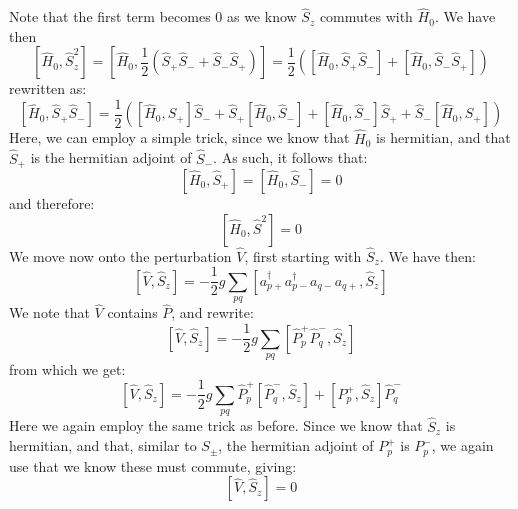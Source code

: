 \documentclass{article}
\begin{document}
Note that the first term becomes 0 as we know $\hat S_z$ commutes with $\hat H_0$. We have then
\begin{equation*}
    \left[ \hat H_0, \hat S_z^2 \right] = \left[\hat H_0, \frac{1}{2} \left(\hat S_+ \hat S_- + \hat S_- \hat S_+\right) \right] = \frac{1}{2} \left( \left[\hat H_0, \hat S_+ \hat S_-\right] + \left[\hat H_0, \hat S_- \hat S_+ \right]\right)
\end{equation*}
rewritten as:
\begin{equation*}
    \left[ \hat H_0, \hat S_+ \hat S_- \right] = \frac{1}{2} \left( \left[\hat H_0, \hat S_+\right] \hat S_- + \hat S_+ \left[\hat H_0, \hat S_- \right] +  \left[\hat H_0, \hat S_-\right] \hat S_+ + \hat S_- \left[\hat H_0, S_+ \right]\right)
\end{equation*}
Here, we can employ a simple trick, since we know that $\hat H_0$ is hermitian, and that $\hat S_+$ is the hermitian adjoint of $\hat S_-$. As such, it follows that:
\begin{equation*}
    \left[\hat H_0, \hat S_+ \right] = \left[\hat H_0, \hat S_- \right] = 0
\end{equation*}
and therefore:
\begin{equation}
    \left[\hat H_0, \hat S^2 \right] = 0
\end{equation}
We move now onto the perturbation $\hat V$, first starting with $\hat S_z$. We have then:
\begin{equation*}
    \left[\hat V, \hat S_z \right] = - \frac{1}{2} g \sum_{pq} \left[a_{p+}^\dagger a_{p-}^\dagger a_{q-} a_{q+}, \hat S_z \right]
\end{equation*}
We note that $\hat V$ contains $\hat P$, and rewrite:
\begin{equation*}
    \left[\hat V, \hat S_z \right] = - \frac{1}{2} g \sum_{pq} \left[\hat P_p ^+ \hat P_q^-, \hat S_z \right]
\end{equation*}
from which we get:
\begin{equation*}
    \left[\hat V, \hat S_z \right] = - \frac{1}{2} g \sum_{pq} \hat P_p^+\left[\hat P_q^-, \hat S_z \right] + \left[P_p^+, \hat S_z \right] \hat P_q^-
\end{equation*}
Here we again employ the same trick as before. Since we know that $\hat S_z$ is hermitian, and that, similar to $S_\pm$, the hermitian adjoint of $P_p^+$ is $P_p^-$, we again use that we know these must commute, giving:
\begin{equation}
    \left[ \hat V, \hat S_z \right] = 0
\end{equation}
\end{document}
